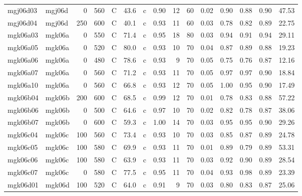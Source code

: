 \documentclass{article}
\begin{document}
\begin{landscape}
\begin{longtable}{llrrlrlrrrrrrrr}
    mgj06d03 &     mgj06d &    0 &  560 &     C &    43.6 &   c &  0.90 &  12 &         60 &  0.02 &  0.90 &  0.88 &  0.90 &   47.53 \\
    mgj06d04 &     mgj06d &  250 &  600 &     C &    40.1 &   c &  0.93 &  11 &         60 &  0.03 &  0.78 &  0.82 &  0.89 &   22.75 \\
    mgk06a03 &     mgk06a &    0 &  550 &     C &    71.4 &   c &  0.95 &  18 &         80 &  0.03 &  0.94 &  0.91 &  0.94 &   29.11 \\
    mgk06a05 &     mgk06a &    0 &  520 &     C &    80.0 &   c &  0.93 &  10 &         70 &  0.04 &  0.87 &  0.89 &  0.88 &   19.23 \\
    mgk06a06 &     mgk06a &    0 &  480 &     C &    78.6 &   c &  0.93 &   9 &         70 &  0.05 &  0.75 &  0.76 &  0.87 &   12.16 \\
    mgk06a07 &     mgk06a &    0 &  560 &     C &    71.2 &   c &  0.93 &  11 &         70 &  0.05 &  0.97 &  0.97 &  0.90 &   18.84 \\
    mgk06a10 &     mgk06a &    0 &  560 &     C &    66.8 &   c &  0.93 &  12 &         70 &  0.05 &  1.00 &  0.95 &  0.90 &   17.49 \\
    mgk06b04 &     mgk06b &  200 &  600 &     C &    68.5 &   c &  0.99 &  12 &         70 &  0.01 &  0.78 &  0.83 &  0.88 &   57.22 \\
    mgk06b06 &     mgk06b &    0 &  500 &     C &    64.6 &   c &  0.97 &  10 &         70 &  0.02 &  0.82 &  0.78 &  0.87 &   38.06 \\
    mgk06b07 &     mgk06b &    0 &  600 &     C &    59.3 &   c &  1.00 &  14 &         70 &  0.03 &  0.95 &  0.95 &  0.90 &   29.26 \\
    mgk06c04 &     mgk06c &  100 &  560 &     C &    73.4 &   c &  0.93 &  10 &         70 &  0.03 &  0.85 &  0.87 &  0.89 &   24.78 \\
    mgk06c05 &     mgk06c &  100 &  580 &     C &    69.9 &   c &  0.93 &  11 &         70 &  0.01 &  0.89 &  0.79 &  0.89 &   53.31 \\
    mgk06c06 &     mgk06c &  100 &  580 &     C &    63.9 &   c &  0.93 &  11 &         70 &  0.03 &  0.92 &  0.90 &  0.89 &   28.54 \\
    mgk06c07 &     mgk06c &    0 &  580 &     C &    77.5 &   c &  0.95 &  11 &         70 &  0.04 &  0.93 &  0.98 &  0.89 &   23.39 \\
    mgk06d01 &     mgk06d &  100 &  520 &     C &    64.0 &   c &  0.91 &   9 &         70 &  0.03 &  0.80 &  0.83 &  0.87 &   25.06 \\

\end{longtable}
\end{landscape}
\end{document}
